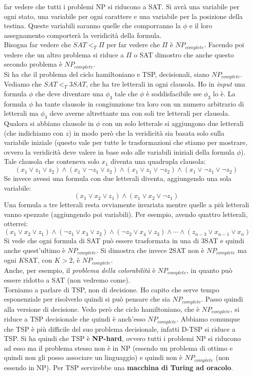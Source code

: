 far vedere che tutti i problemi NP si riducono a SAT. Si avrà una variabile per
ogni stato, una variabile per ogni carattere e una variabile per la posizione
della testina. Queste variabili saranno quelle che comporranno la $\phi$ e il
loro assegnamento comporterà la veridicità della formula.\\
Bisogna far vedere che $SAT<_T \Pi$ per far vedere che $\Pi$ è
$NP_{complete}$. Facendo poi vedere che un altro problema si riduce a $\Pi$ o SAT
dimostro che anche questo secondo problema è $NP_{complete}$. \\
Si ha che il problema del ciclo hamiltoniano e TSP, decisionali, siano
$NP_{complete}$.\\
Vediamo che $SAT<_T 3SAT$, che ha tre letterali in ogni clausola. Ho in \textit{input}
una formula $\phi$ che deve diventare una $\phi_3$ tale che $\phi$ è
soddisfacibile sse $\phi_3$ lo è. La formula $\phi$ ha tante clausole in
congiunzione tra loro con un numero arbitrario di letterali ma $\phi_3$ deve
averne altrettante ma con soli tre letterali per clausola. Qualora si abbiano
clausole in $\phi$ con un solo letterale si aggiungono due letterali (che
indichiamo con $z$) in modo
però che la veridicità sia basata solo sulla variabile iniziale (questo vale per
tutte le trasformazioni che stiamo per mostrare, ovvero la veridicità deve
valere in base solo alle variabili iniziali della formula $\phi$). Tale clausola
che conteneva solo $x_1$ diventa una quadrupla clausola:
\[(x_1\lor z_1\lor z_2)\land (x_1\lor\neg z_1\lor z_2)\land (x_1\lor z_1\lor\neg
  z_2)\land(x_1\lor\neg z_1\lor\neg z_2)\] 
Se invece avessi una formula con due letterali diventa, aggiungendo una sola
variabile: 
\[(x_1\lor x_2\lor z_1)\land (x_1\lor x_2\lor \neg z_1)\]
Una formula a tre letterali resta ovviamente invariata mentre quelle a più
letterali vanno spezzate (aggiungendo poi variabili). Per esempio, avendo
quattro letterali, otterrei:
\[(x_1\lor x_2\lor z_1)\land (\neg z_1\lor x_3\lor z_2)\land (\neg z_2\lor
  x_4\lor z_3)\land\cdots\land(z_{n-3}\lor x_{n-1}\lor x_n)\]
Si vede che ogni formula di SAT può essere trasformata in una di 3SAT e quindi
anche quest'ultimo è $NP_{complete}$. Si dimostra che invece 2SAT non è $NP_{complete}$
ma ogni $K$SAT, con $K>2$, è $NP_{complete}$.\\
Anche, per esempio, il \textit{problema della colorabilità} è $NP_{complete}$, in
quanto può essere ridotto a SAT (non vedremo come).\\
Torniamo a parlare di TSP, non di decisione. Ho capito che serve tempo
esponenziale per risolverlo quindi si può pensare che sia $NP_{complete}$. Passo
quindi alla versione di decisione. Vedo però che ciclo
hamiltoniano, che è $NP_{complete}$, si riduce a TSP decisionale che quindi è
anch'esso $NP_{complete}$. Abbiamo comunque che TSP è più difficile del suo problema
decisionale, infatti D-TSP si riduce a TSP. Si ha quindi che TSP è
\textbf{NP-hard}, ovvero tutti i problemi NP si riducono ad esso ma il problema
stesso non è in NP (essendo un problema di ottimo e quindi non gli posso
associare un linguaggio) e quindi non è $NP_{complete}$ (non essendo in NP). Per
TSP servirebbe una \textbf{macchina di Turing ad oracolo}.
